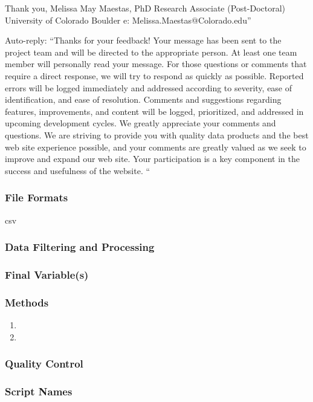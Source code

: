 Thank you, 
Melissa May Maestas, PhD
Research Associate (Post-Doctoral)
University of Colorado Boulder
e: Melissa.Maestas@Colorado.edu''

Auto-reply:
``Thanks for your feedback!
Your message has been sent to the project team and will be directed to the appropriate person. At least one team member will personally read your message. For those questions or comments that require a direct response, we will try to respond as quickly as possible. Reported errors will be logged immediately and addressed according to severity, ease of identification, and ease of resolution. Comments and suggestions regarding features, improvements, and content will be logged, prioritized, and addressed in upcoming development cycles.
We greatly appreciate your comments and questions. We are striving to provide you with quality data products and the best web site experience possible, and your comments are greatly valued as we seek to improve and expand our web site. Your participation is a key component in the success and usefulness of the website. ``

\subsubsection*{File Formats} 
csv

\subsubsection*{Data Filtering and Processing}



\subsubsection*{Final Variable(s)}

\subsubsection*{Methods}

\begin{enumerate}
\item 
\item
\end{enumerate}

\subsubsection*{Quality Control}

\subsubsection*{Script Names}

